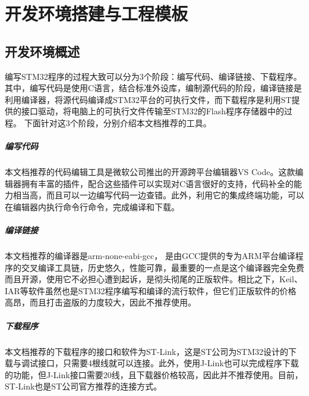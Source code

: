 \renewenvironment{longtable}{\rowcolors{2}{LightGray}{white}\oldlongtable} {\endoldlongtable}
\chapter{开发环境搭建与工程模板}
\section{开发环境概述}
编写STM32程序的过程大致可以分为3个阶段：编写代码、编译链接、下载程序。其中，编写代码是使用C语言，结合标准外设库，编制源代码的阶段，编译链接是利用编译器，将源代码编译成STM32平台的可执行文件，而下载程序是利用ST提供的接口驱动，将电脑上的可执行文件传输至STM32的Flash程序存储器中的过程。
下面针对这3个阶段，分别介绍本文档推荐的工具。
\paragraph{编写代码} 
本文档推荐的代码编辑工具是微软公司推出的开源跨平台编辑器VS Code。这款编辑器拥有丰富的插件，配合这些插件可以实现对C语言很好的支持，代码补全的能力相当高，而且可以一边编写代码一边查错。此外，利用它的集成终端功能，可以在编辑器内执行命令行命令，完成编译和下载。
\paragraph{编译链接}
本文档推荐的编译器是arm-none-eabi-gcc， 是由GCC提供的专为ARM平台编译程序的交叉编译工具链，历史悠久，性能可靠，最重要的一点是这个编译器完全免费而且开源，使用它不必担心遭到起诉，是彻头彻尾的正版软件。相比之下，Keil、IAR等软件虽然也是STM32程序编写和编译的流行软件，但它们正版软件的价格高昂，而且打击盗版的力度较大，因此不推荐使用。
\paragraph{下载程序}
本文档推荐的下载程序的接口和软件为ST-Link，这是ST公司为STM32设计的下载与调试接口，只需要4根线就可以连接。此外，使用J-Link也可以完成程序下载的功能，但J-Link接口需要20线，且下载器价格较高，因此并不推荐使用。目前，ST-Link也是ST公司官方推荐的连接方式。

